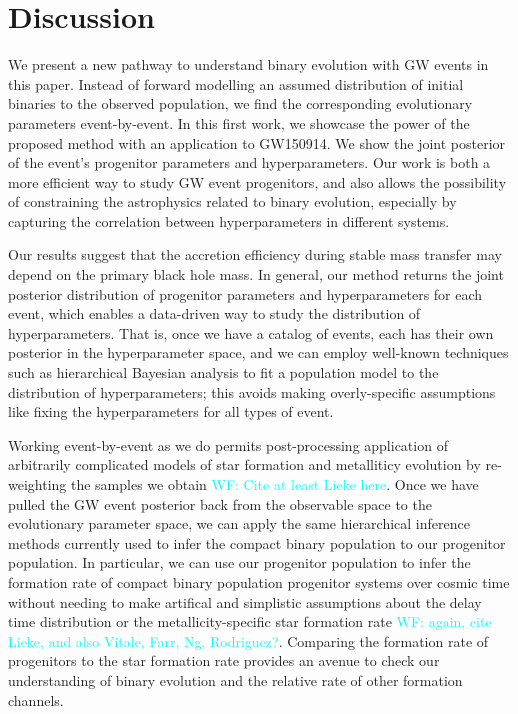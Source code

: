 \documentclass[twocolumn]{aastex631}
\newcommand{\wf}[1]{\textcolor{cyan}{WF: #1}}
\begin{document}
\section{Discussion}
\label{sec:discussion}


We present a new pathway to understand binary evolution with GW events in this
paper. Instead of forward modelling an assumed distribution of initial binaries
to the observed population, we find the corresponding evolutionary parameters
event-by-event. In this first work, we showcase the power of the proposed method
with an application to GW150914. We show the joint posterior of the event's
progenitor parameters and hyperparameters.  Our work is both a more efficient
way to study GW event progenitors, and also allows the possibility of
constraining the astrophysics related to binary evolution, especially by
capturing the correlation between hyperparameters in different systems. 

Our results suggest that the accretion efficiency during stable mass transfer
may depend on the primary black hole mass.  In general, our method returns the
joint posterior distribution of progenitor parameters and hyperparameters for
each event, which enables a data-driven way to study the distribution of
hyperparameters.  That is, once we have a catalog of events, each has their own
posterior in the hyperparameter space, and we can employ well-known techniques
such as hierarchical Bayesian analysis to fit a population model to the
distribution of hyperparameters; this avoids making overly-specific assumptions
like fixing the hyperparameters for all types of event. 

Working event-by-event as we do permits post-processing application of
 arbitrarily complicated models of star formation and metalliticy evolution by
 re-weighting the samples we obtain \wf{Cite at least Lieke here}. Once we have
 pulled the GW event posterior back from the observable space to the
 evolutionary parameter space, we can apply the same hierarchical inference
 methods currently used to infer the compact binary population to our progenitor
 population.  In particular, we can use our progenitor population to infer the
 formation rate of compact binary population progenitor systems over cosmic time
 without needing to make artifical and simplistic assumptions about the delay
 time distribution or the metallicity-specific star formation rate \wf{again,
 cite Lieke, and also Vitale, Farr, Ng, Rodriguez?}.  Comparing the formation
 rate of progenitors to the star formation rate provides an avenue to check our
 understanding of binary evolution and the relative rate of other formation
 channels.
\end{document}
